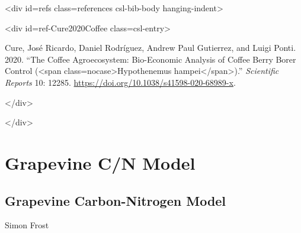 <div id={\textquotedbl}refs{\textquotedbl} class={\textquotedbl}references csl-bib-body hanging-indent{\textquotedbl}>



<div id={\textquotedbl}ref-Cure2020Coffee{\textquotedbl} class={\textquotedbl}csl-entry{\textquotedbl}>



Cure, José Ricardo, Daniel Rodríguez, Andrew Paul Gutierrez, and Luigi Ponti. 2020. “The Coffee Agroecosystem: Bio-Economic Analysis of Coffee Berry Borer Control (<span class={\textquotedbl}nocase{\textquotedbl}>Hypothenemus hampei</span>).” \emph{Scientific Reports} 10: 12285. \href{https://doi.org/10.1038/s41598-020-68989-x}{https://doi.org/10.1038/s41598-020-68989-x}.



</div>



</div>



\chapter{Grapevine C/N Model}


\section{Grapevine Carbon-Nitrogen Model}



\label{1938877306425762001}{}


Simon Frost



